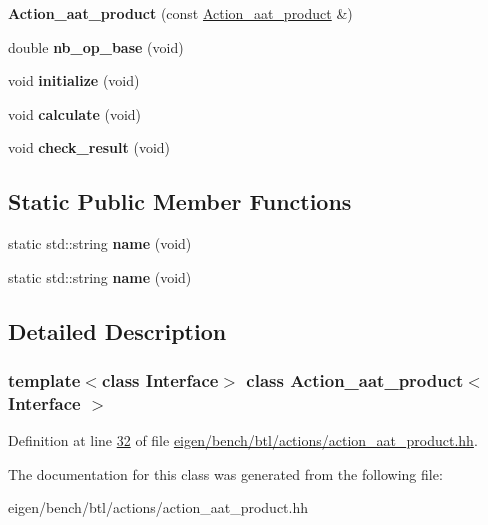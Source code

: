 \begin{DoxyCompactItemize}
{\bfseries Action\+\_\+aat\+\_\+product} (const \hyperlink{class_action__aat__product}{Action\+\_\+aat\+\_\+product} \&)
\item 
\mbox{\label{class_action__aat__product_a0b040d07f3ba9d13005463eca2ca945a}} 
double {\bfseries nb\+\_\+op\+\_\+base} (void)
\item 
\mbox{\label{class_action__aat__product_a497ef68e00b4ef503131d65769cb412c}} 
void {\bfseries initialize} (void)
\item 
\mbox{\label{class_action__aat__product_ab4b5b71c95f24c9a4ca2cf6cc7315a39}} 
void {\bfseries calculate} (void)
\item 
\mbox{\label{class_action__aat__product_a7edabf4aed91eff88a4aacc6dd077e02}} 
void {\bfseries check\+\_\+result} (void)
\end{DoxyCompactItemize}
\subsection*{Static Public Member Functions}
\begin{DoxyCompactItemize}
\item 
\mbox{\label{class_action__aat__product_aa321c556f20c6f35905ec91e23507175}} 
static std\+::string {\bfseries name} (void)
\item 
\mbox{\label{class_action__aat__product_aa321c556f20c6f35905ec91e23507175}} 
static std\+::string {\bfseries name} (void)
\end{DoxyCompactItemize}


\subsection{Detailed Description}
\subsubsection*{template$<$class Interface$>$\newline
class Action\+\_\+aat\+\_\+product$<$ Interface $>$}



Definition at line \hyperlink{eigen_2bench_2btl_2actions_2action__aat__product_8hh_source_l00032}{32} of file \hyperlink{eigen_2bench_2btl_2actions_2action__aat__product_8hh_source}{eigen/bench/btl/actions/action\+\_\+aat\+\_\+product.\+hh}.



The documentation for this class was generated from the following file\+:\begin{DoxyCompactItemize}
\item 
eigen/bench/btl/actions/action\+\_\+aat\+\_\+product.\+hh\end{DoxyCompactItemize}

